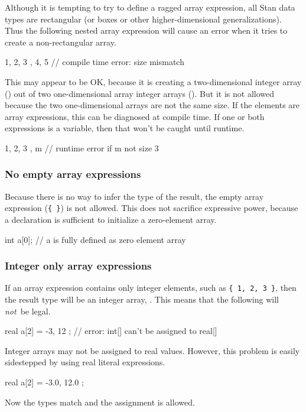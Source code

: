 Although it is tempting to try to define a ragged array expression,
all Stan data types are rectangular (or boxes or other
higher-dimensional generalizations).  Thus the following nested array
expression will cause an error when it tries to create a
non-rectangular array.
%
\begin{stancode}
{ { 1, 2, 3 }, { 4, 5 } }  // compile time error: size mismatch
\end{stancode}
%
This may appear to be OK, because it is creating a two-dimensional
integer array () out of two one-dimensional array
integer arrays ().  But it is not allowed because the two
one-dimensional arrays are not the same size.  If the elements are
array expressions, this can be diagnosed at compile time.  If one or
both expressions is a variable, then that won't be caught until
runtime.
%
\begin{stancode}
{ { 1, 2, 3 }, m }  // runtime error if m not size 3
\end{stancode}


\subsubsection{No empty array expressions}

Because there is no way to infer the type of the result, the empty
array expression (\Verb|{ }|) is not allowed.  This does not sacrifice
expressive power, because a declaration is sufficient to initialize a
zero-element array.
%
\begin{stancode}
int a[0];   // a is fully defined as zero element array
\end{stancode}


\subsubsection{Integer only array expressions}

If an array expression contains only integer elements, such as
\Verb|{ 1, 2, 3 }|, then the result type will be an integer array,
.  This means that the following will \emph{not}\ be
legal.
%
\begin{stancode}
real a[2] = { -3, 12 };  // error: int[] can't be assigned to real[]
\end{stancode}
%
Integer arrays may not be assigned to real values.  However, this
problem is easily sidestepped by using real literal expressions.
%
\begin{stancode}
real a[2] = { -3.0, 12.0 };
\end{stancode}
%
Now the types match and the assignment is allowed.


